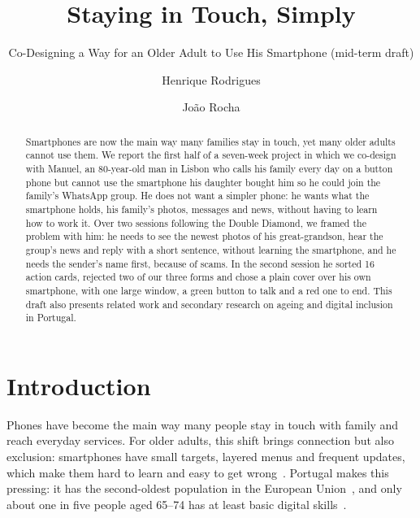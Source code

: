\documentclass[acmtog,nonacm]{acmart}
\begin{document}
\title{Staying in Touch, Simply}
\subtitle{Co-Designing a Way for an Older Adult to Use His Smartphone (mid-term draft)}

\author{Henrique Rodrigues}
\author{Jo\~ao Rocha}

\renewcommand{\shortauthors}{Rodrigues and Rocha}

\begin{abstract}
Smartphones are now the main way many families stay in touch, yet many older adults cannot use them. We report the first half of a seven-week project in which we co-design with Manuel, an 80-year-old man in Lisbon who calls his family every day on a button phone but cannot use the smartphone his daughter bought him so he could join the family's WhatsApp group. He does not want a simpler phone: he wants what the smartphone holds, his family's photos, messages and news, without having to learn how to work it. Over two sessions following the Double Diamond, we framed the problem with him: he needs to see the newest photos of his great-grandson, hear the group's news and reply with a short sentence, without learning the smartphone, and he needs the sender's name first, because of scams. In the second session he sorted 16 action cards, rejected two of our three forms and chose a plain cover over his own smartphone, with one large window, a green button to talk and a red one to end. This draft also presents related work and secondary research on ageing and digital inclusion in Portugal.
\end{abstract}



\maketitle

\section{Introduction}
Phones have become the main way many people stay in touch with family and reach everyday services. For older adults, this shift brings connection but also exclusion: smartphones have small targets, layered menus and frequent updates, which make them hard to learn and easy to get wrong~\cite{kurniawan2008older, leung2012older}. Portugal makes this pressing: it has the second-oldest population in the European Union~\cite{eurostat2025population}, and only about one in five people aged 65--74 has at least basic digital skills~\cite{eurostat2025digitalskills}.
\end{document}
